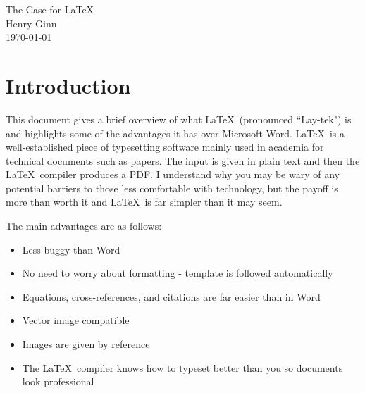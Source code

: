 	
\begin{center}
	\vspace*{-20mm}
	\huge The Case for \LaTeX\  \\
	\vspace{5mm}
	\large Henry Ginn  \\
	\vspace{3 mm}
	\large \today
\end{center}

\section{Introduction}
\label{Introduction}

This document gives a brief overview of what \LaTeX\ (pronounced ``Lay-tek") is and highlights some of the advantages it has over Microsoft Word. \LaTeX\ is a well-established piece of typesetting software mainly used in academia for technical documents such as papers. The input is given in plain text and then the \LaTeX\ compiler produces a PDF. I understand why you may be wary of any potential barriers to those less comfortable with technology, but the payoff is more than worth it and \LaTeX\ is far simpler than it may seem.

The main advantages are as follows:

\begin{itemize}
	\item Less buggy than Word
	\item No need to worry about formatting - template is followed automatically
	\item Equations, cross-references, and citations are far easier than in Word
	\item Vector image compatible
	\item Images are given by reference
	\item The \LaTeX\ compiler knows how to typeset better than you so documents look professional
\end{itemize}

